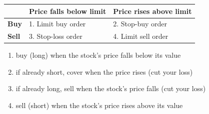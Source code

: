 \documentclass{beamer}
\begin{document}
\begin{frame}{}
\begin{center}
\begin{tabular}{l|ll}
& \textbf{Price falls below limit} & \textbf{Price rises above limit} \\ \hline
\textbf{Buy} & 1. Limit buy order & 2. Stop-buy order \\
\textbf{Sell} & 3. Stop-loss order & 4. Limit sell order
\end{tabular}
\end{center}
\begin{enumerate}
	\item buy (long) when the stock's price falls below its value
	\item if already short, cover when the price rises (cut your loss)
	\item if already long, sell when the stock's price falls (cut your loss)
	\item sell (short) when the stock's price rises above its value
\end{enumerate}
\end{frame}
\end{document}
